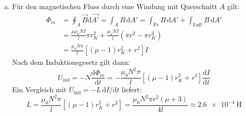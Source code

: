\begin{enumerate}[(a)]
\item Für den magnetischen Fluss durch eine Windung mit Querschnitt $A$ gilt:
\begin{align}
\Phi_m &= \oint_A \vec{B}\mathrm{d}\vec{A'} = \int_A B \,\mathrm{d}A' = \int_\text{Fe} B \,\mathrm{d}A' + \int_\text{Luft} B \,\mathrm{d}A' \\
&= \frac{\mu\mu_0 N I }{l} \pi r_K^2 + \frac{\mu_0 N I}{l} (\pi r^2-\pi r_K^2)\\
&= \frac{\mu_0 N \pi}{l}\left[ (\mu-1) r_K^2 +r^2 \right] I
\end{align}
Nach dem Induktionsgesetz gilt dann:
\begin{equation}
U_\text{ind} = -N \frac{\mathrm{d}\Phi_m}{\mathrm{d}t} =- \frac{\mu_0 N^2 \pi}{l}\left[ (\mu-1) r_K^2 +r^2 \right] \frac{\mathrm{d}I}{\mathrm{d}t}
\end{equation}
Ein Vergleich mit $U_\text{ind}=-L \,\mathrm{d}I/\mathrm{d}t$ liefert:
\begin{equation}
L = \frac{\mu_0 N^2 \pi}{l}\left[ (\mu-1) r_K^2 +r^2 \right] = \frac{\mu_0 N^2 \pi r^2(\mu+3)}{4l} \approx \SI{2.6e-4}{\henry}
\end{equation}

\end{enumerate}
